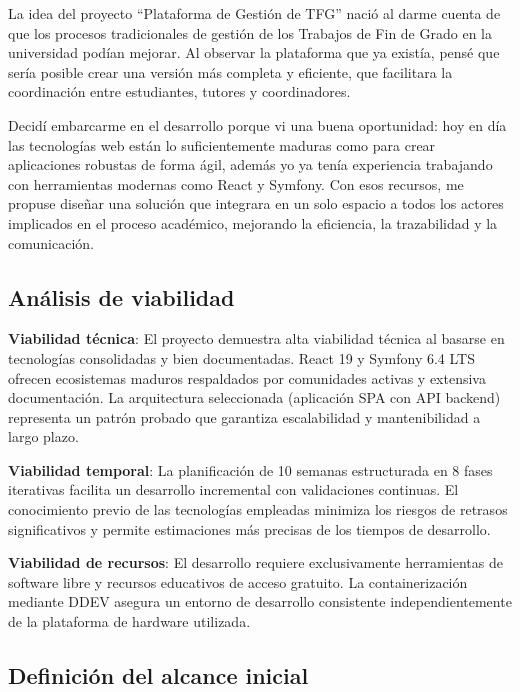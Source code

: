 \documentclass[12pt,a4paper,oneside]{report}
\begin{document}
La idea del proyecto “Plataforma de Gestión de TFG” nació al darme cuenta de que los procesos tradicionales de gestión de los Trabajos de Fin de Grado en la universidad podían mejorar. Al observar la plataforma que ya existía, pensé que sería posible crear una versión más completa y eficiente, que facilitara la coordinación entre estudiantes, tutores y coordinadores.

Decidí embarcarme en el desarrollo porque vi una buena oportunidad: hoy en día las tecnologías web están lo suficientemente maduras como para crear aplicaciones robustas de forma ágil, además yo ya tenía experiencia trabajando con herramientas modernas como React y Symfony. Con esos recursos, me propuse diseñar una solución que integrara en un solo espacio a todos los actores implicados en el proceso académico, mejorando la eficiencia, la trazabilidad y la comunicación.

\subsection{Análisis de viabilidad}\label{anuxe1lisis-de-viabilidad}

\textbf{Viabilidad técnica}: El proyecto demuestra alta viabilidad técnica al basarse en tecnologías consolidadas y bien documentadas. React 19 y Symfony 6.4 LTS ofrecen ecosistemas maduros respaldados por comunidades activas y extensiva documentación. La arquitectura seleccionada (aplicación SPA con API backend) representa un patrón probado que garantiza escalabilidad y mantenibilidad a largo plazo.

\textbf{Viabilidad temporal}: La planificación de 10 semanas estructurada en 8 fases iterativas facilita un desarrollo incremental con validaciones continuas. El conocimiento previo de las tecnologías empleadas minimiza los riesgos de retrasos significativos y permite estimaciones más precisas de los tiempos de desarrollo.

\textbf{Viabilidad de recursos}: El desarrollo requiere exclusivamente herramientas de software libre y recursos educativos de acceso gratuito. La containerización mediante DDEV asegura un entorno de desarrollo consistente independientemente de la plataforma de hardware utilizada.

\subsection{Definición del alcance
inicial}\label{definiciuxf3n-del-alcance-inicial}
\end{document}
